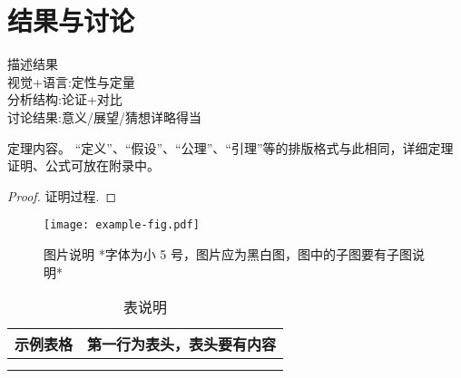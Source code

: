 \documentclass{cjc}
\begin{document}
\section{结果与讨论}
描述结果\:\\
视觉+语言:定性与定量\\
分析结构:论证+对比\\
讨论结果:意义/展望/猜想\(详略得当\)\\


\begin{theorem}
  定理内容。
  “定义”、“假设”、“公理”、“引理”等的排版格式与此相同，详细定理证明、公式可放在附录中。
\end{theorem}


\begin{proof}
  证明过程.
\end{proof}

\begin{figure}[htb]
  \centering
  \texttt{[image: example-fig.pdf]}
  \caption{图片说明 *字体为小 5 号，图片应为黑白图，图中的子图要有子图说明*}
\end{figure}

\begin{table}[htb]
  \centering
  \caption{表说明}
  \small
  \begin{tabular}{cc}
    \toprule
    示例表格 & 第一行为表头，表头要有内容 \\
    \midrule
    & \\
    \midrule
    & \\
    \bottomrule
  \end{tabular}
\end{table}


\end{document}
